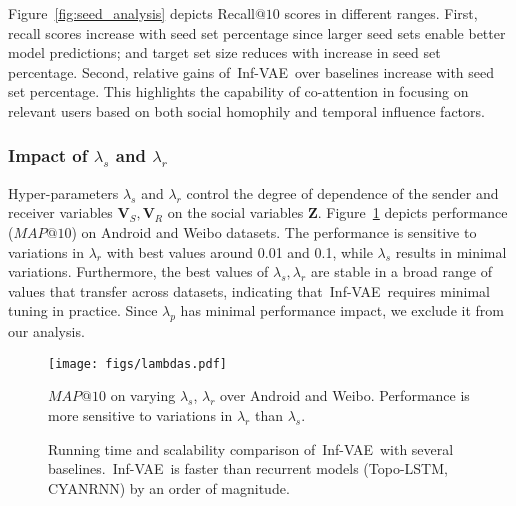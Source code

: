 \documentclass[sigconf]{acmart}
\newcommand{\name}{Inf-VAE}
\def\mV{{\bm{V}}}
\def\mZ{{\bm{Z}}}
\begin{document}
Figure~\ref{fig:seed_analysis} depicts Recall$@10$ scores in different ranges. First, recall scores increase with seed set percentage since larger seed sets enable better model predictions; and target set size reduces with increase in seed set percentage.
Second, relative gains of~\name~over baselines increase with seed set percentage. This highlights the capability of co-attention in focusing on relevant users based on both social homophily and temporal influence factors.


\subsubsection{\textbf{Impact of $\lambda_s$ and $\lambda_r$}}
Hyper-parameters $\lambda_s$ and $\lambda_r$ control the degree of dependence of the sender and receiver variables $\mV_S, \mV_R$ on the social variables $\mZ$.
Figure~\ref{fig:lambda_heatmap} depicts performance ($MAP@10$) on Android and Weibo datasets.
The performance is sensitive to variations in $\lambda_r$ with best values around 0.01 and 0.1,
while $\lambda_s$ results in minimal variations.
Furthermore, the best values of $\lambda_s, \lambda_r$ are stable in a broad range of values that transfer across datasets, indicating that~\name~requires minimal tuning in practice.
Since $\lambda_p$ has minimal performance impact, we exclude it from our analysis.






\begin{figure}[t]
\vspace{-5pt}
    \centering
    \texttt{[image: figs/lambdas.pdf]}
     \vspace{-18pt}
    \caption{$MAP@10$ on varying $\lambda_s$, $\lambda_r$ over Android and Weibo. Performance is more sensitive to variations in $\lambda_r$ than $\lambda_s$.}
    \vspace{-12pt}
    \label{fig:lambda_heatmap}
\end{figure}

\begin{figure}[t]
    \vspace{-3pt}
    \centering
        \hspace{2pt}
    \vspace{-10pt}
    \caption{Running time and scalability comparison of~\name~with several baselines.~\name~is faster than recurrent models (Topo-LSTM, CYANRNN) by an order of magnitude.}
    \vspace{-11pt}
\end{figure}
\end{document}
